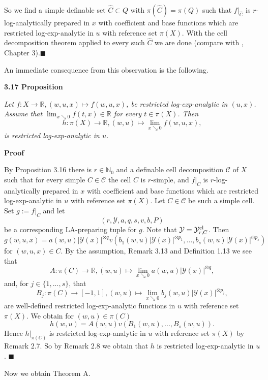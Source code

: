 \documentclass[12pt]{article}
\def\vs{\vspace}
\begin{document}
\vs{0.2cm}
So we find a simple definable set $\hat{C} \subset Q$ with $\pi(\hat{C})=\pi(Q)$ such that $f|_{\hat{C}}$ is $r$-log-analytically prepared in $x$ with coefficient and base functions which are restricted log-exp-analytic in $u$ with reference set $\pi(X)$. With the cell decomposition theorem applied to every such $\hat{C}$ we are done (compare with \cite{3}, Chapter 3).\hfill$\blacksquare$

\vs{0.5cm}
An immediate consequence from this observation is the following.

\vs{0.5cm}
{\bf3.17 Proposition}

\vs{0.1cm}
{\it
Let $f:X \to \mathbb{R}, (w,u,x) \mapsto f(w,u,x)$, be restricted log-exp-analytic in $(u,x)$. Assume that $\lim_{x \searrow 0} f(t,x) \in \mathbb{R}$ for every $t \in \pi(X)$. Then $$h:\pi(X) \to \mathbb{R}, (w,u) \mapsto \lim_{x \searrow 0}f(w,u,x),$$
is restricted log-exp-analytic in $u$.}

\vs{0.4cm}
{\bf Proof}

\vs{0.1cm}
By Proposition 3.16 there is $r \in \mathbb{N}_0$ and a definable cell decomposition $\mathcal{C}$ of $X$ such that for every simple $C \in \mathcal{C}$ the cell $C$ is $r$-simple, and $f|_C$ is $r$-log-analytically prepared in $x$ with coefficient and base functions which are restricted log-exp-analytic in $u$ with reference set $\pi(X)$. Let $C \in \mathcal{C}$ be such a simple cell. Set $g:=f|_C$ and let 
$$(r,\mathcal{Y},a,q,s,v,b,P)$$
be a corresponding LA-preparing tuple for $g$. Note that $\mathcal{Y}=\mathcal{Y}_{r,C}^{\textnormal{el}}$. Then 
$$g(w,u,x)=a(w,u)\vert{\mathcal{Y}(x)}\vert^{\otimes q}v(b_1(w,u)\vert{\mathcal{Y}(x)}\vert^{\otimes p_1},...,b_s(w,u)\vert{\mathcal{Y}(x)}\vert^{\otimes p_s})$$ 
for $(w,u,x) \in C$. By the assumption, Remark 3.13 and Definition 1.13 we see that 
$$A:\pi(C) \to \mathbb{R}, (w,u) \mapsto \lim_{x \searrow 0} a(w,u)\vert{\mathcal{Y}(x)}\vert^{\otimes q},$$
and, for $j \in \{1,...,s\}$, that
$$B_j:\pi(C) \to [-1,1], (w,u) \mapsto \lim_{x \searrow 0} b_j(w,u)\vert{\mathcal{Y}(x)}\vert^{\otimes p_j},$$
are well-defined restricted log-exp-analytic functions in $u$ with reference set $\pi(X)$. We obtain for $(w,u) \in \pi(C)$
$$h(w,u)=A(w,u)v(B_1(w,u),...,B_s(w,u)).$$
Hence $h|_{\pi(C)}$ is restricted log-exp-analytic in $u$ with reference set $\pi(X)$ by Remark 2.7. So by Remark 2.8 we obtain that $h$ is restricted log-exp-analytic in $u$. \hfill$\blacksquare$

\vs{0.2cm}
Now we obtain Theorem A.
\end{document}
